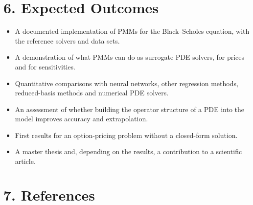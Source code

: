 \documentclass[12pt,a4paper]{article}
\begin{document}
\section*{6. Expected Outcomes}

\begin{itemize}
    \item A documented implementation of PMMs for the Black--Scholes
    equation, with the reference solvers and data sets.
    \item A demonstration of what PMMs can do as surrogate PDE
    solvers, for prices and for sensitivities.
    \item Quantitative comparisons with neural networks, other
    regression methods, reduced-basis methods and numerical PDE
    solvers.
    \item An assessment of whether building the operator structure of
    a PDE into the model improves accuracy and extrapolation.
    \item First results for an option-pricing problem without a
    closed-form solution.
    \item A master thesis and, depending on the results, a
    contribution to a scientific article.
\end{itemize}

\section*{7. References}
\end{document}
